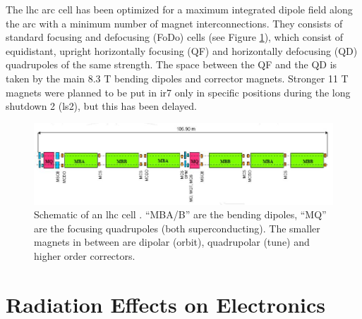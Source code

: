 \documentclass[encoding=utf8,british]{tumphthesis}
\begin{document}
The \acrshort{lhc} arc cell has been optimized for a maximum integrated dipole field along the arc with a minimum number of magnet interconnections. They consists of standard focusing and defocusing (FoDo) cells (see Figure \ref{fig:LHC-FODO-lattice-lhc-design-report}), which consist of equidistant, upright horizontally focusing (QF) and horizontally defocusing (QD) quadrupoles of the same strength. The space between the QF and the QD is taken by the main 8.3 T bending dipoles and corrector magnets. Stronger 11 T magnets were planned to be put in \acrshort{ir}7 only in specific positions during the long shutdown 2 (\acrshort{ls}2), but this has been delayed.



\begin{figure}[H]
    \centering
    \includegraphics[width=1.0\linewidth]{figures/lhc_FODO_lattice.jpg}
    \caption{Schematic of an \acrshort{lhc} cell  \cite{LHC-design-report}. “MBA/B” are the bending dipoles, “MQ” are the focusing quadrupoles (both superconducting). The smaller magnets in between are dipolar (orbit), quadrupolar (tune) and higher order correctors.}
    \label{fig:LHC-FODO-lattice-lhc-design-report}
\end{figure}

\chapter{Radiation Effects on  Electronics}
\label{chapter:R2E}
\end{document}
